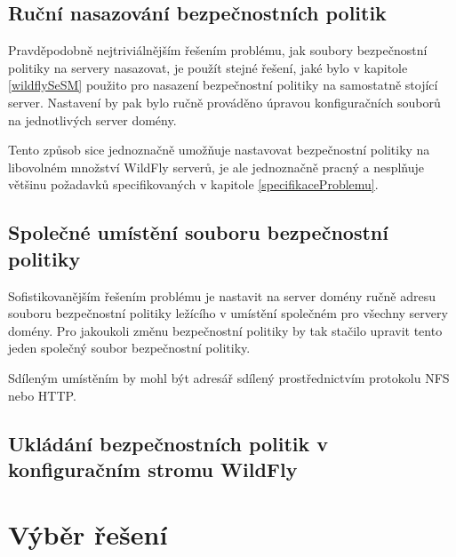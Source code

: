 \subsection{Ruční nasazování bezpečnostních politik} \label{reseniRucni}

Pravděpodobně nejtriviálnějším řešením problému, jak soubory bezpečnostní politiky na servery nasazovat, je použít stejné řešení, jaké bylo v kapitole \ref{wildflySeSM} použito pro nasazení bezpečnostní politiky na samostatně stojící server.
Nastavení by pak bylo ručně prováděno úpravou konfiguračních souborů na jednotlivých server domény.

Tento způsob sice jednoznačně umožňuje nastavovat bezpečnostní politiky na libovolném množství WildFly serverů,
je ale jednoznačně pracný a nesplňuje většinu požadavků specifikovaných v kapitole \ref{specifikaceProblemu}.

\subsection{Společné umístění souboru bezpečnostní politiky} \label{reseniSpolecne}

Sofistikovanějším řešením problému je nastavit na server domény ručně adresu souboru bezpečnostní politiky ležícího v umístění společném pro všechny servery domény.
Pro jakoukoli změnu bezpečnostní politiky by tak stačilo upravit tento jeden společný soubor bezpečnostní politiky.

Sdíleným umístěním by mohl být adresář sdílený prostřednictvím protokolu NFS nebo HTTP.

\subsection{Ukládání bezpečnostních politik v konfiguračním stromu WildFly} \label{reseniSpolecne}



\section{Výběr řešení} \label{vyberReseni}








